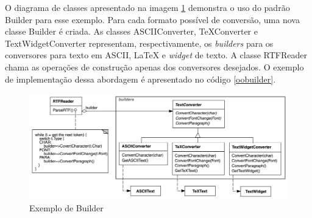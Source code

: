 O diagrama de classes apresentado na imagem 
\ref{builder_exemplo} demonstra o uso do padrão 
Builder para esse exemplo. Para cada formato possível 
de conversão, uma nova classe Builder é criada. 
As classes ASCIIConverter, TeXConverter e 
TextWidgetConverter representam, respectivamente, 
os \textit{builders} para os conversores para texto 
em ASCII, LaTeX e \textit{widget} de texto. A classe 
RTFReader chama as operações de construção 
apenas dos conversores desejados. O exemplo de 
implementação dessa abordagem é apresentado no 
código \ref{oobuilder}.

\begin{figure}[htb]
	\caption{\label{builder_exemplo}Exemplo de Builder}
	\begin{center}
	    \includegraphics[scale=0.4]{5_padroes-contexto-funcional/5.1_criacionais/5.1.3_builder/exemplo_builder.png}
	\end{center}
\end{figure}

